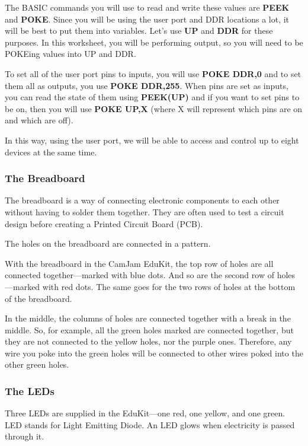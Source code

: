 The BASIC commands you will use to read and write these values are \textbf{PEEK} and \textbf{POKE}.  Since you will be using the user port and DDR locations a lot, it will be best to put them into variables.  Let's use \textbf{UP} and \textbf{DDR} for these purposes.  In this worksheet, you will be performing output, so you will need to be POKEing values into UP and DDR.

To set all of the user port pins to inputs, you will use \textbf{POKE DDR,0} and to set them all as outputs, you use \textbf{POKE DDR,255}.  When pins are set as inputs, you can read the state of them using \textbf{PEEK(UP)} and if you want to set pins to be on, then you will use \textbf{POKE UP,X} (where X will represent which pins are on and which are off).

In this way, using the user port, we will be able to access and control up to eight devices at the same time.

\subsubsection*{The Breadboard}

The breadboard is a way of connecting electronic components to each other without having to solder them together.  They are often used to test a circuit design before creating a Printed Circuit Board (PCB).


The holes on the breadboard are connected in a pattern.

With the breadboard in the CamJam EduKit, the top row of holes are all connected together---marked with blue dots.  And so are the second row of holes---marked with red dots.  The same goes for the two rows of holes at the bottom of the breadboard.

In the middle, the columns of holes are connected together with a break in the middle.  So, for example, all the green holes marked are connected together, but they are not connected to the yellow holes, nor the purple ones.  Therefore, any wire you poke into the green holes will be connected to other wires poked into the other green holes.

\subsubsection*{The LEDs}


Three LEDs are supplied in the EduKit---one red, one yellow, and one green.  LED stands for Light Emitting Diode.  An LED glows when electricity is passed through it.

